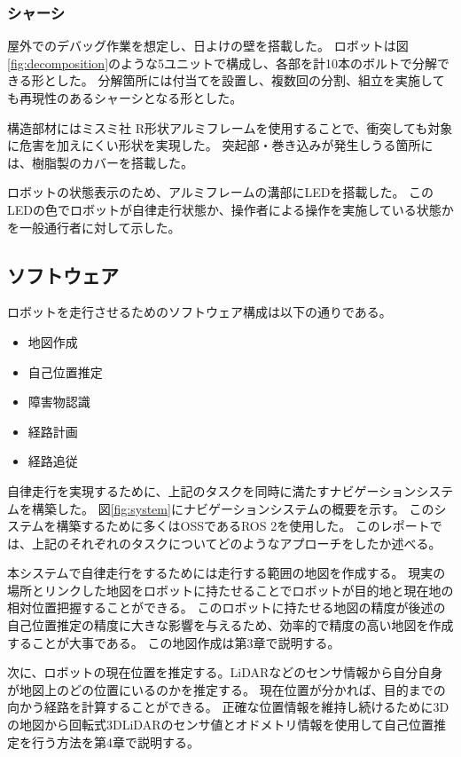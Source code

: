 \subsubsection{シャーシ}
屋外でのデバッグ作業を想定し、日よけの壁を搭載した。
ロボットは図\ref{fig:decomposition}のような5ユニットで構成し、各部を計10本のボルトで分解できる形とした。
分解箇所には付当てを設置し、複数回の分割、組立を実施しても再現性のあるシャーシとなる形とした。

構造部材にはミスミ社 R形状アルミフレーム\cite{MISUMI}を使用することで、衝突しても対象に危害を加えにくい形状を実現した。
突起部・巻き込みが発生しうる箇所には、樹脂製のカバーを搭載した。

ロボットの状態表示のため、アルミフレームの溝部にLEDを搭載した。
このLEDの色でロボットが自律走行状態か、操作者による操作を実施している状態かを一般通行者に対して示した。



\subsection{ソフトウェア}
ロボットを走行させるためのソフトウェア構成は以下の通りである。
\begin{itemize}
    \item 地図作成
    \item 自己位置推定
    \item 障害物認識
    \item 経路計画
    \item 経路追従
\end{itemize}

自律走行を実現するために、上記のタスクを同時に満たすナビゲーションシステムを構築した。
図\ref{fig:system}にナビゲーションシステムの概要を示す。
このシステムを構築するために多くはOSSであるROS 2\cite{ROS2}を使用した。
このレポートでは、上記のそれぞれのタスクについてどのようなアプローチをしたか述べる。

本システムで自律走行をするためには走行する範囲の地図を作成する。
現実の場所とリンクした地図をロボットに持たせることでロボットが目的地と現在地の相対位置把握することができる。
このロボットに持たせる地図の精度が後述の自己位置推定の精度に大きな影響を与えるため、効率的で精度の高い地図を作成することが大事である。
この地図作成は第3章で説明する。

次に、ロボットの現在位置を推定する。LiDARなどのセンサ情報から自分自身が地図上のどの位置にいるのかを推定する。
現在位置が分かれば、目的までの向かう経路を計算することができる。
正確な位置情報を維持し続けるために3Dの地図から回転式3DLiDARのセンサ値とオドメトリ情報を使用して自己位置推定を行う方法を第4章で説明する。

